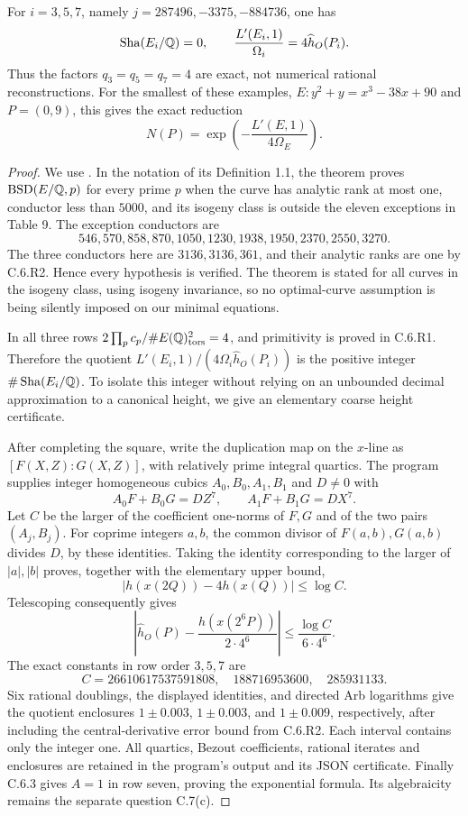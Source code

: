 \begin{statement}
For $i=3,5,7$, namely $j=287496,-3375,-884736$, one has
\[
 \operatorname{Sha}(E_i/\mathbb Q)=0,\qquad
 \frac{L'(E_i,1)}{\Omega_i}=4\widehat h_O(P_i).
\]
Thus the factors $q_3=q_5=q_7=4$ are exact, not numerical
rational reconstructions. For the smallest of these examples,
$E:y^2+y=x^3-38x+90$ and $P=(0,9)$, this gives the exact
reduction
\[
 N(P)=\exp\left(-\frac{L'(E,1)}{4\Omega_E}\right).
\]
\end{statement}
\begin{proof}
We use \citet[Theorem 1.2 and Table 9]{miller2011}. In the
notation of its Definition 1.1, the theorem proves
$\mathrm{BSD}(E/\mathbb Q,p)$ for every prime $p$ when the curve has
analytic rank at most one, conductor less than $5000$, and
its isogeny class is outside the eleven exceptions in Table 9.
The exception conductors are
\[
546,570,858,870,1050,1230,1938,1950,2370,2550,3270.
\]
The three conductors here are $3136,3136,361$, and their
analytic ranks are one by C.6.R2. Hence every hypothesis is
verified. The theorem is stated for all curves in the isogeny
class, using isogeny invariance, so no optimal-curve assumption
is being silently imposed on our minimal equations.

In all three rows
$2\prod_pc_p/\#E(\mathbb Q)_{\rm tors}^2=4$, and primitivity is
proved in C.6.R1. Therefore the quotient
$L'(E_i,1)/(4\Omega_i\widehat h_O(P_i))$ is the positive
integer $\#\operatorname{Sha}(E_i/\mathbb Q)$. To isolate this integer
without relying on an unbounded decimal approximation to a
canonical height, we give an elementary coarse height certificate.

After completing the square, write the duplication map on the
$x$-line as $[F(X,Z):G(X,Z)]$, with relatively prime integral
quartics. The program
 supplies integer
homogeneous cubics $A_0,B_0,A_1,B_1$ and $D\ne0$ with
\[
 A_0F+B_0G=DZ^7,\qquad A_1F+B_1G=DX^7.
\]
Let $C$ be the larger of the coefficient one-norms of $F,G$
and of the two pairs $(A_j,B_j)$. For coprime integers $a,b$,
the common divisor of $F(a,b),G(a,b)$ divides $D$, by these
identities. Taking the identity corresponding to the larger
of $|a|,|b|$ proves, together with the elementary upper bound,
\[
 |h(x(2Q))-4h(x(Q))|\leq\log C.
\]
Telescoping consequently gives
\[
 \left|\widehat h_O(P)-\frac{h(x(2^6P))}{2\cdot4^6}\right|
 \leq\frac{\log C}{6\cdot4^6}.
\]
The exact constants in row order $3,5,7$ are
\[
 C=26610617537591808,\quad188716953600,\quad285931133.
\]
Six rational doublings, the displayed identities, and directed
Arb logarithms give the quotient enclosures
$1\pm0.003$, $1\pm0.003$, and $1\pm0.009$, respectively,
after including the central-derivative error bound from C.6.R2.
Each interval contains only the integer one. All quartics,
Bezout coefficients, rational iterates and enclosures are
retained in the program's output and its JSON certificate.
Finally C.6.3 gives $A=1$ in row seven, proving the exponential
formula. Its algebraicity remains the separate question C.7(c).
\end{proof}

